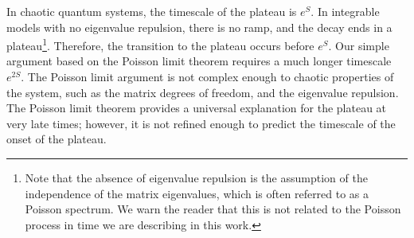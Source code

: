 \documentclass[a4paper,11pt]{article}
\theoremstyle{definition}
\numberwithin{equation}{section}
\begin{document}
In chaotic quantum systems, the timescale of the plateau is $e^S$. In integrable models with no eigenvalue repulsion, there is no ramp, and the decay ends in a plateau\footnote{Note that the absence of eigenvalue repulsion is the assumption of the independence of the matrix eigenvalues, which is often referred to as a Poisson spectrum. We warn the reader that this is not related to the Poisson process in time we are describing in this work.}. Therefore, the transition to the plateau occurs before $e^S$. Our simple argument based on the Poisson limit theorem requires a much longer timescale $e^{2S}$. The Poisson limit argument is not complex enough to chaotic properties of the system, such as the matrix degrees of freedom, and the eigenvalue repulsion. The  Poisson limit theorem provides a universal explanation for the plateau at very late times; however, it is not refined enough to predict the timescale of the onset of the plateau. 
\end{document}
